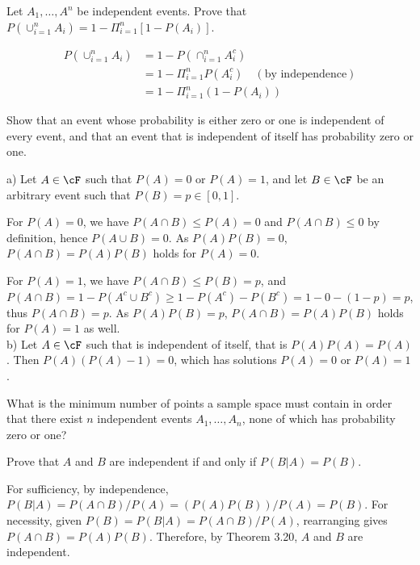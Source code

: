 \begin{exercise}
  Let $A_1,\ldots,A^n$ be independent events. Prove that $P(\cup_{i=1}^nA_i)=1-\Pi_{i=1}^n[1-P(A_i)]$.
\end{exercise}
\begin{solution}
  \begin{align*}
    P(\cup_{i=1}^nA_i) &= 1 - P(\cap_{i=1}^n A_i^c) \\
      &= 1 - \Pi_{i=1}^n P(A_i^c)  \quad(\mbox{by independence}) \\
      &= 1 - \Pi_{i=1}^n (1-P(A_i))
  \end{align*}
\end{solution}


\begin{exercise}
  Show that an event whose probability is either zero or one is independent of every event, and that an event that is independent of itself has probability zero or one.
\end{exercise}
\begin{solution}
  a) Let $A\in\cF$ such that $P(A)=0$ or $P(A)=1$, and let $B\in\cF$ be an arbitrary event such that $P(B)=p\in[0, 1]$.

  For $P(A)=0$, we have $P(A\cap B)\leq P(A) = 0$ and $P(A\cap B)\leq 0$ by definition, hence $P(A\cup B) =0$. As $P(A)P(B)=0$, $P(A\cap B)=P(A)P(B)$ holds for $P(A)=0$.

  For $P(A)=1$, we have $P(A\cap B)\leq P(B) = p$, and $P(A\cap B) = 1 - P(A^c\cup B^c) \geq 1 - P(A^c) - P(B^c) = 1 - 0 - (1-p) = p$, thus $P(A\cap B) = p$. As $P(A)P(B)=p$, $P(A\cap B)=P(A)P(B)$ holds for $P(A)=1$ as well. \\

  b) Let $A\in\cF$ such that is independent of itself, that is $P(A)P(A) = P(A)$. Then $P(A)(P(A)-1)=0$, which has solutions $P(A)=0$ or $P(A)=1$.
\end{solution}


\begin{exercise}
  What is the minimum number of points a sample space must contain in order that there exist $n$ independent events $A_1,\ldots,A_n$, none of which has probability zero or one?
\end{exercise}
\begin{solution}
  [TODO]
\end{solution}


\begin{exercise}
  Prove that $A$ and $B$ are independent if and only if $P(B|A) = P(B)$.
\end{exercise}
\begin{solution}
  For sufficiency, by independence, $P(B|A) = P(A\cap B)/P(A) = (P(A)P(B))/P(A) = P(B)$. For necessity, given $P(B) = P(B|A) = P(A\cap B)/P(A)$, rearranging gives $P(A\cap B)=P(A)P(B)$. Therefore, by Theorem 3.20, $A$ and $B$ are independent.
\end{solution}
